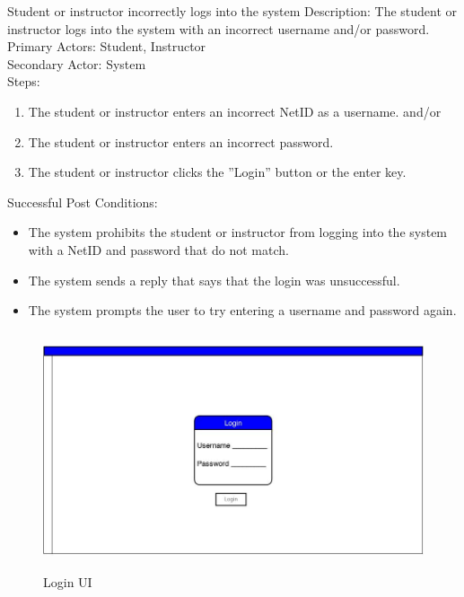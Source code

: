        \begin{section}{Student or instructor incorrectly logs into the system}
    Description: The student or instructor logs into the system with an incorrect username and/or password.\\
    Primary Actors: Student, Instructor\\
    Secondary Actor: System\\
    Steps:
        \begin{enumerate}
            \item The student or instructor enters an incorrect NetID as a username.
            	and/or
            \item The student or instructor enters an incorrect password.
            \item The student or instructor clicks the ''Login'' button or the enter key.\\
        \end{enumerate}
    Successful Post Conditions:
        \begin{itemize}
            \item The system prohibits the student or instructor from logging into the system with a NetID and password that do not match.
            \item The system sends a reply that says that the login was unsuccessful.
            \item The system prompts the user to try entering a username and password again.
        \end{itemize}
                    \begin{figure}[H]
            \centerline{\includegraphics[height=7cm]{UILogin.jpg}}
            \caption{Login UI}
    \end{figure}
    \end{section}



